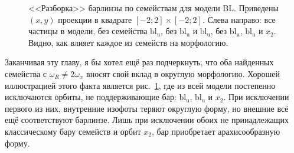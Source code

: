 \documentclass[tikz]{trlnotes}
\begin{document}
\begin{figure}[htpb]
  \centering
  \caption{<<Разборка>> барлинзы по семействам для модели BL. Приведены $(x,y)$ проекции в квадрате $[-2;2]\times [-2;2]$.
  Слева направо: все частицы в модели, без семейства $\text{bl}_\text{u}$, без $\text{bl}_\text{u}$ и $\text{bl}_\text{u}$, 
без $\text{bl}_\text{u}$, $\text{bl}_\text{u}$ и $x_2$. Видно, как влияет каждое из семейств на морфологию.}%
  \label{fig:lensapart}
\end{figure}

Заканчивая эту главу, я бы хотел ещё раз подчеркнуть, что оба найденных семейства с $ω_R \neq 2ω_x$ вносят свой вклад в
округлую морфологию. Хорошей иллюстрацией этого факта является рис.~\ref{fig:lensapart}, где из всей модели постепенно
исключаются орбиты, не поддерживающие бар: $\text{bl}_\text{u}$, $\text{bl}_\text{u}$ и $x_2$. При исключении
первого из них, внутренние изофоты теряют округлую форму, но внешние всё ещё соответствуют барлинзе.
Лишь при исключении обоих не принадлежащих классическому бару семейств и орбит $x_2$, бар приобретает арахисообразную форму.
\end{document}
